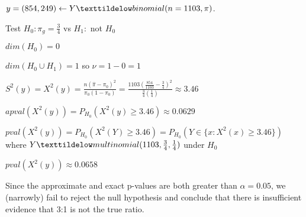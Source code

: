 \documentclass{article}
\begin{document}
$y = (854, 249) \leftarrow Y \texttildelow binomial(n=1103, \pi)$.

Test $H_0: \pi_g = \frac{3}{4}$ vs $H_1:$ not $H_0$

$dim(H_0) = 0$

$dim(H_0 \cup H_1) = 1$ so $\nu = 1-0 = 1$

$S^2(y) = X^2(y) = \frac{n(\hat{\pi} - \pi_0)^2}{\pi_0(1-\pi_0)} = \frac{1103(\frac{854}{1103} - \frac{3}{4})^2}{\frac{3}{4}(\frac{1}{4})} \approx 3.46$

$apval(X^2(y)) = P_{H_0}(X^2(y) \geq 3.46) \approx 0.0629$

$pval(X^2(y)) = P_{H_0}(X^2(Y) \geq 3.46) = P_{H_0}(Y \in \{x:X^2(x) \geq 3.46\})$ where $Y \texttildelow multinomial (1103, \frac{3}{4}, \frac{1}{4})$ under $H_0$

$pval(X^2(y)) \approx 0.0658$

Since the approximate and exact p-values are both greater than $\alpha = 0.05$, we (narrowly) fail to reject the null hypothesis and conclude that there is insufficient evidence that 3:1 is not the true ratio.
\end{document}
